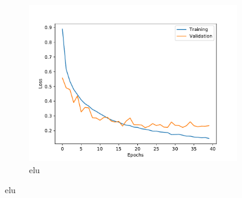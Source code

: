 \documentclass[aspectratio=1610, professionalfonts, 9pt]{beamer}
\begin{document}
\begin{frame}
\begin{figure}[H]
\begin{subfigure}{0.3\textwidth}
            \includegraphics[width=1.2\linewidth]{images/loss_history_elu.pdf}%
            \caption{elu}%
        \end{subfigure}%
    \end{figure}%
\end{frame}
\end{document}
